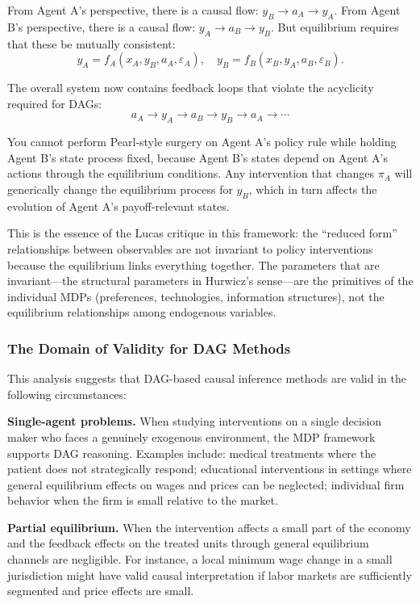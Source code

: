 \documentclass[12pt]{article}
\begin{document}
From Agent A's perspective, there is a causal flow: $y_B \to a_A \to y_A$. From Agent B's perspective, there is a causal flow: $y_A \to a_B \to y_B$. But equilibrium requires that these be mutually consistent:
\[
y_A = f_A(x_A, y_B, a_A, \varepsilon_A), \quad y_B = f_B(x_B, y_A, a_B, \varepsilon_B).
\]

The overall system now contains feedback loops that violate the acyclicity required for DAGs:
\[
a_A \to y_A \to a_B \to y_B \to a_A \to \cdots
\]

You cannot perform Pearl-style surgery on Agent A's policy rule while holding Agent B's state process fixed, because Agent B's states depend on Agent A's actions through the equilibrium conditions. Any intervention that changes $\pi_A$ will generically change the equilibrium process for $y_B$, which in turn affects the evolution of Agent A's payoff-relevant states.

This is the essence of the Lucas critique in this framework: the ``reduced form'' relationships between observables are not invariant to policy interventions because the equilibrium links everything together. The parameters that are invariant---the structural parameters in Hurwicz's sense---are the primitives of the individual MDPs (preferences, technologies, information structures), not the equilibrium relationships among endogenous variables.

\subsubsection{The Domain of Validity for DAG Methods}

This analysis suggests that DAG-based causal inference methods are valid in the following circumstances:

\textbf{Single-agent problems.} When studying interventions on a single decision maker who faces a genuinely exogenous environment, the MDP framework supports DAG reasoning. Examples include: medical treatments where the patient does not strategically respond; educational interventions in settings where general equilibrium effects on wages and prices can be neglected; individual firm behavior when the firm is small relative to the market.

\textbf{Partial equilibrium.} When the intervention affects a small part of the economy and the feedback effects on the treated units through general equilibrium channels are negligible. For instance, a local minimum wage change in a small jurisdiction might have valid causal interpretation if labor markets are sufficiently segmented and price effects are small.
\end{document}
